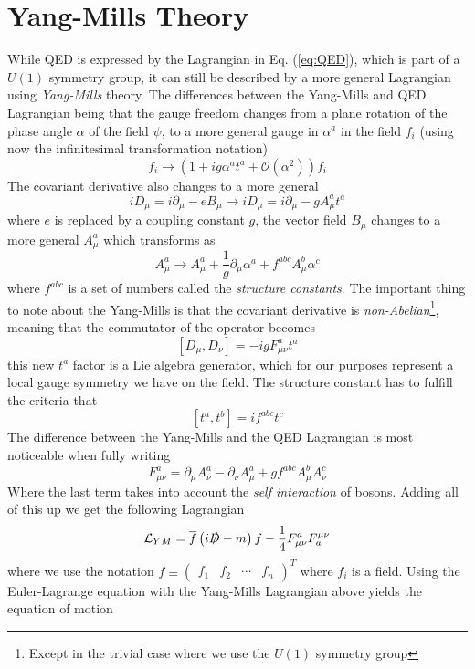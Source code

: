 \documentclass[12pt, a4paper]{book}
\begin{document}
\section{Yang-Mills Theory}
While QED is expressed by the Lagrangian in Eq. (\ref{eq:QED}), which is part of a $U(1)$ symmetry group, it can still be described by a more general Lagrangian using \textit{Yang-Mills} theory.
The differences between the Yang-Mills and QED Lagrangian being that the gauge freedom changes from a plane rotation of the phase angle $\alpha$ of the field $\psi$, to a more general
gauge in $\alpha^a$ in the field $f_i$ (using now the infinitesimal transformation notation)
$$
    f_i \rightarrow \left(1+ig \alpha^a t^a + \mathcal{O}(\alpha^2)\right) f_i    
$$
The covariant derivative also changes to a more general 
$$
iD_\mu = i\partial_\mu -eB_\mu\rightarrow iD_\mu = i\partial_\mu -gA^a_\mu t^a
$$
where $e$ is replaced by a coupling constant $g$, the vector field $B_\mu$ changes to a more general $A_\mu^a$ which transforms as 
$$
A_\mu^a \rightarrow A^a_\mu +\frac{1}{g}\partial_\mu\alpha^a +f^{abc}A_\mu^b\alpha^c
$$
where $f^{abc}$ is a set of numbers called the \textit{structure constants}. 
The important thing to note about the Yang-Mills is that the covariant derivative is \textit{non-Abelian}\footnote{Except in the trivial case where we use the $U(1)$ symmetry group}, meaning that the commutator of the operator becomes
$$
\left[D_\mu,D_\nu\right] = -igF_{\mu\nu}^at^a
$$
this new $t^a$ factor is a Lie algebra generator, which for our purposes represent a local gauge symmetry we have on the field. The structure constant has to fulfill the criteria that
\begin{equation}\label{eq:struc_const}
    [t^a,t^b]=if^{abc}t^c
\end{equation}
The difference between the Yang-Mills and the QED Lagrangian is most noticeable when fully writing
$$
F_{\mu\nu}^a = \partial_\mu A_\nu^a -\partial_\nu A_\mu^a +gf^{abc}A_\mu^b A_\nu^c
$$
Where the last term takes into account the \textit{self interaction} of bosons. Adding all of this up we get the following Lagrangian
\begin{equation}\label{eq:YM_lag}
    \mathcal{L}_{YM} = \overline{f}\left(i\slashed{D} -m\right)f -\frac{1}{4}F^a_{\mu\nu}F^{\mu\nu}_a
\end{equation}
where we use the notation $f\equiv\begin{pmatrix}f_1&f_2&\cdots&f_n\end{pmatrix}^T$ where $f_i$ is a field. 
Using the Euler-Lagrange equation with the Yang-Mills Lagrangian above yields the equation of motion
\end{document}
